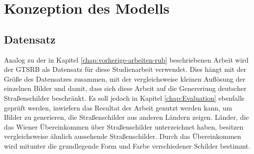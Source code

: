 \chapter{Konzeption des Modells}
\label{chap:konzept}
\section{Datensatz}
Analog zu der in Kapitel \ref{chap:vorherige-arbeiten-rub} beschriebenen Arbeit wird der \ac{GTSRB} als Datensatz für diese Studienarbeit verwendet. Dies hängt mit der Größe des Datensatzes zusammen, mit der vergleichsweise kleinen Auflösung der einzelnen Bilder und damit, dass sich diese Arbeit auf die Genereriung deutscher Straßenschilder beschränkt. Es soll jedoch in Kapitel \ref{chap:Evaluation} ebenfalls geprüft werden, inwiefern das Resultat der Arbeit genutzt werden kann, um Bilder zu generieren, die Straßenschilder aus anderen Ländern zeigen. Länder, die das Wiener Übereinkommen über Straßenschilder unterzeichnet haben, besitzen vergleichsweise ähnlich aussehende Straßenschilder. Durch das Übereinkommen wird mitunter die grundlegende Form und Farbe verschiedener Schilder bestimmt. \cite{GTSRB} \cite{vienna-convention}

